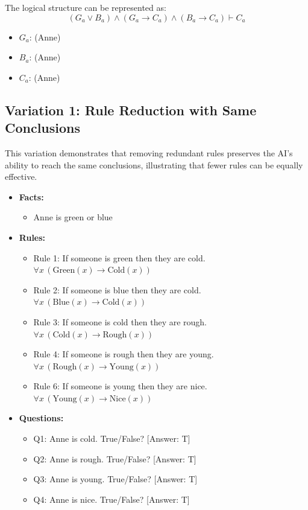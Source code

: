 \documentclass{article} %
\begin{document}
The logical structure can be represented as:
\[
(G_a \lor B_a) \land (G_a \rightarrow C_a) \land (B_a \rightarrow C_a) \vdash C_a
\]

\begin{itemize}
    \item $G_a$: (Anne)
    \item $B_a$: (Anne)
    \item $C_a$: (Anne)
\end{itemize}


\subsection{Variation 1: Rule Reduction with Same Conclusions}

This variation demonstrates that removing redundant rules preserves the AI's ability to reach the same conclusions, illustrating that fewer rules can be equally effective.

\begin{itemize}
    \item \textbf{Facts:}
    \begin{itemize}
        \item Anne is green or blue
    \end{itemize}
    
    \item \textbf{Rules:}
    \begin{itemize}
        \item Rule 1: If someone is green then they are cold. $\forall x \, (\text{Green}(x) \rightarrow \text{Cold}(x))$
        \item Rule 2: If someone is blue then they are cold. $\forall x \, (\text{Blue}(x) \rightarrow \text{Cold}(x))$
        \item Rule 3: If someone is cold then they are rough. $\forall x \, (\text{Cold}(x) \rightarrow \text{Rough}(x))$
        \item Rule 4: If someone is rough then they are young. $\forall x \, (\text{Rough}(x) \rightarrow \text{Young}(x))$
        \item Rule 6: If someone is young then they are nice. $\forall x \, (\text{Young}(x) \rightarrow \text{Nice}(x))$
    \end{itemize}
    
    \item \textbf{Questions:}
    \begin{itemize}
        \item Q1: Anne is cold. True/False? [Answer: T]
        \item Q2: Anne is rough. True/False? [Answer: T]
        \item Q3: Anne is young. True/False? [Answer: T]
        \item Q4: Anne is nice. True/False? [Answer: T]
    \end{itemize}
\end{itemize}
\end{document}
